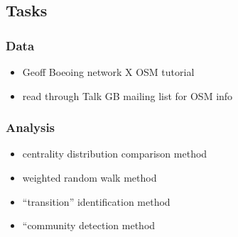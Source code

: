 \documentclass[11pt]{article} %
\begin{document}
\subsection{Tasks}

\subsubsection{Data}
		\begin{itemize}
			\item Geoff Boeoing network X OSM tutorial
			\item read through Talk GB mailing list for OSM info
		\end{itemize}

\subsubsection{Analysis}
		\begin{itemize}
			\item centrality distribution comparison method
			\item weighted random walk method
			\item ``transition'' identification method
			\item ``community detection method
		\end{itemize}
\end{document}
